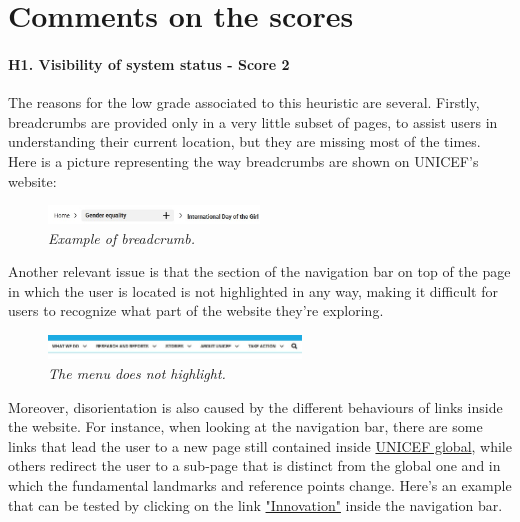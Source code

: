 \endgroup


\clearpage



\section*{Comments on the scores}
\paragraph{H1. Visibility of system status - Score 2} \label{subsec:H1}	
The reasons for the low grade associated to this heuristic are several. Firstly, breadcrumbs are provided only in a very little subset of pages, to assist users in understanding their current location, but they are missing most of the times. Here is a picture representing the way breadcrumbs are shown on UNICEF's website:
\begin{figure}[!h]
	\begin{center}
		\includegraphics[width=0.5\textwidth]{FinalScores1.jpg}
		\captionsetup{font=small}
		\caption{\textit{Example of breadcrumb.}}
	\end{center}
\end{figure}
\newline Another relevant issue is that the section of the navigation bar on top of the page in which the user is located is not highlighted in any way, making it difficult for users to recognize what part of the website they're exploring.
\begin{figure}[!h]
	\begin{center}
		\includegraphics[width=0.6\textwidth]{FinalScores2.jpg}
		\captionsetup{font=small}
		\caption{\textit{The menu does not highlight.}}
	\end{center}
\end{figure}
\newline
Moreover, disorientation is also caused by the different behaviours of links inside the website. For instance, when looking at the navigation bar, there are some links that lead the user to a new page still contained inside \href{https://www.unicef.org/}{UNICEF global}, while others redirect the user to a sub-page that is distinct from the global one and in which the fundamental landmarks and reference points change. Here's an example that can be tested by clicking on the link \href{https://www.unicef.org/innovation/}{"Innovation"} inside the navigation bar.
